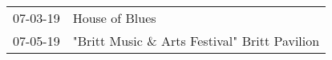 \begin{supertabular}{p{0.07\textwidth}p{0.23\textwidth}}
 07-03-19 &                                House of Blues \\
 07-05-19 &  "Britt Music \& Arts Festival" Britt Pavilion \\
\end{supertabular}

